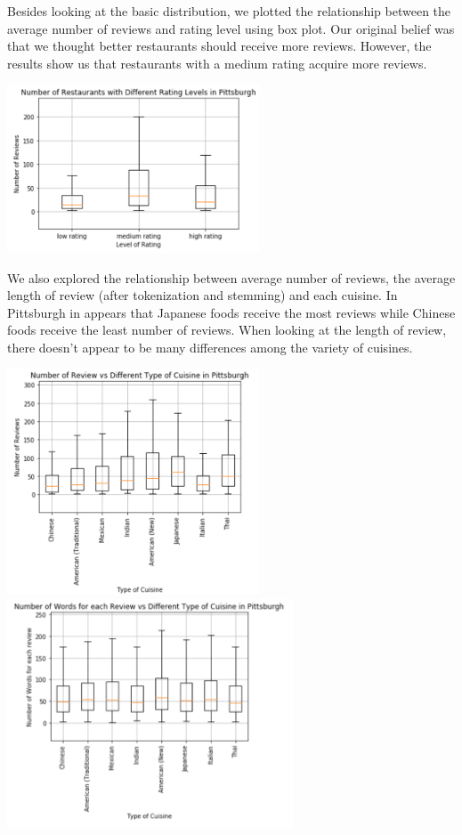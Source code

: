 \documentclass{neu_handout}
\begin{document}
Besides looking at the basic distribution, we plotted the relationship between the average number of reviews and rating level using box plot. Our original belief was that we thought better restaurants should receive more reviews. However, the results show us that restaurants with a medium rating acquire more reviews. 

\begin{center}
	\includegraphics[width=75mm,scale=0.3]{number_of_restaurants_vs_rating_level}
\end{center}

We also explored the relationship between average number of reviews, the average length of review (after tokenization and stemming) and each cuisine. In Pittsburgh in appears that Japanese foods receive the most reviews while Chinese foods receive the least number of reviews. When looking at the length of review, there doesn't appear to be many differences among the variety of cuisines. 

\begin{center}
	\includegraphics[width=75mm,scale=0.3]{number_of_review_vs_cuisine}
	\includegraphics[width=85mm,scale=0.3]{average_review_length}
\end{center}
\end{document}
